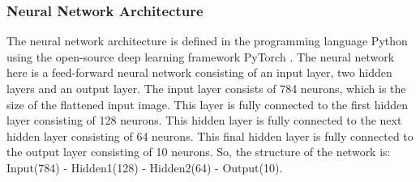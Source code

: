 \subsubsection{Neural Network Architecture}
The neural network architecture is defined in the programming language Python \cite{python} using the open-source deep learning framework PyTorch \cite{NEURIPS2019_9015}. The neural network here is a feed-forward neural network consisting of an input layer, two hidden layers and an output layer. The input layer consists of 784 neurons, which is the size of the flattened input image. This layer is fully connected to the first hidden layer consisting of 128 neurons. This hidden layer is fully connected to the next hidden layer consisting of 64 neurons. This final hidden layer is fully connected to the output layer consisting of 10 neurons. So, the structure of the network is: Input(784) - Hidden1(128) - Hidden2(64) - Output(10).

